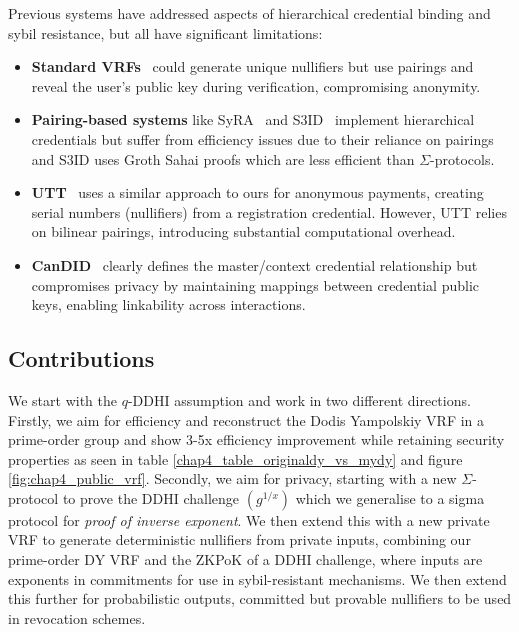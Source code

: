 Previous systems have addressed aspects of hierarchical credential binding and sybil resistance, but all have significant limitations:

\begin{itemize}
    
    \item \textbf{Standard VRFs}~\cite{hutchison_verifiable_2005, goldberg_nsec5_2015} could generate unique nullifiers but use pairings and reveal the user's public key during verification, compromising anonymity.
        
    \item \textbf{Pairing-based systems} like SyRA~\cite{crites_syra_2024} and S3ID~\cite{rabaninejad_attribute-based_2024} implement hierarchical credentials but suffer from efficiency issues due to their reliance on pairings and S3ID uses Groth Sahai proofs which are less efficient than $\Sigma$-protocols.
    
    \item \textbf{UTT}~\cite{tomescu_utt_2022} uses a similar approach to ours for anonymous payments, creating serial numbers (nullifiers) from a registration credential. However, UTT relies on bilinear pairings, introducing substantial computational overhead.
    
    \item \textbf{CanDID}~\cite{maram_candid_2020} clearly defines the master/context credential relationship but compromises privacy by maintaining mappings between credential public keys, enabling linkability across interactions.

\end{itemize}


\subsection{Contributions}\label{sec:vrf-contributions}
We start with the $q$-DDHI assumption and work in two different directions. Firstly, we aim for efficiency and reconstruct the Dodis Yampolskiy VRF in a prime-order group and show 3-5x efficiency improvement while retaining security properties as seen in table \ref{chap4_table_originaldy_vs_mydy} and figure \ref{fig:chap4_public_vrf}. Secondly, we aim for privacy,  starting with a new $\Sigma$-protocol to prove the DDHI challenge $(g^{1/x})$ which we generalise to a sigma protocol for \emph{proof of inverse exponent}. We then extend this with a new private VRF to generate deterministic nullifiers from private inputs, combining our prime-order DY VRF and the ZKPoK of a DDHI challenge, where inputs are exponents in commitments for use in sybil-resistant mechanisms. We then extend this further for probabilistic outputs, committed but provable nullifiers to be used in revocation schemes. 


